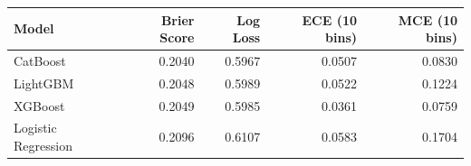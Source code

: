 \begin{tabular}{lrrrr}
\toprule
Model & Brier Score & Log Loss & ECE (10 bins) & MCE (10 bins) \\
\midrule
CatBoost & 0.2040 & 0.5967 & 0.0507 & 0.0830 \\
LightGBM & 0.2048 & 0.5989 & 0.0522 & 0.1224 \\
XGBoost & 0.2049 & 0.5985 & 0.0361 & 0.0759 \\
Logistic Regression & 0.2096 & 0.6107 & 0.0583 & 0.1704 \\
\bottomrule
\end{tabular}

